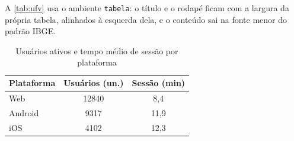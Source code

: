 \documentclass{abntex2-ufv}
\begin{document}
A \autoref{tab:ufv} usa o ambiente \texttt{tabela}: o título e o rodapé ficam com a largura da
própria tabela, alinhados à esquerda dela, e o conteúdo sai na fonte menor do padrão IBGE.

\begin{table}[htbp]
\begin{tabela}{\caption{Usuários ativos e tempo médio de sessão por
                        plataforma}\label{tab:ufv}}%
              {\elaboracaopropria{}}
  \begin{tabular}{l S[table-format=5.0] S[table-format=2.1]}
    \toprule
    \textbf{Plataforma} & {\textbf{Usuários (un.)}}
      & {\textbf{Sessão (min)}} \\
    \midrule
    Web     & 12840 &  8,4 \\
    Android &  9317 & 11,9 \\
    iOS     &  4102 & 12,3 \\
    \bottomrule
  \end{tabular}
\end{tabela}
\end{table}
\end{document}
